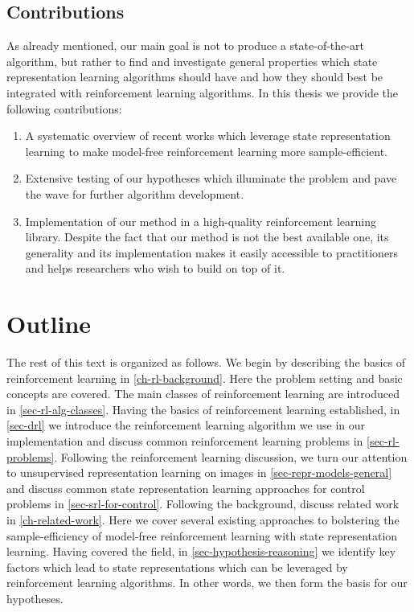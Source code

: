 \subsection{Contributions}
\label{subsec-contributions}
As already mentioned, our main goal is not to produce a state-of-the-art algorithm,
but rather to find and investigate general properties which state representation learning algorithms 
should have and how they should best be integrated with reinforcement learning algorithms.
In this thesis we provide the following contributions:
\begin{enumerate}
	\item A systematic overview of recent works which leverage state representation learning
		to make model-free reinforcement learning more sample-efficient.
	\item Extensive testing of our hypotheses which illuminate the problem and pave the wave 
			for further algorithm development.
	\item Implementation of our method in a high-quality reinforcement learning library.
			Despite the fact that our method is not the best available one, its generality
			and its implementation makes it easily accessible to practitioners and 
			helps researchers who wish to build on top of it.
\end{enumerate}

\section{Outline}
The rest of this text is organized as follows.
We begin by describing the basics of reinforcement learning in \ref{ch-rl-background}.
Here the problem setting and basic concepts are covered.
The main classes of 
reinforcement learning are introduced in \ref{sec-rl-alg-classes}.
Having the basics of reinforcement learning established, 
in \ref{sec-drl} we introduce the reinforcement learning algorithm 
we use in our implementation
and discuss common reinforcement learning problems in \ref{sec-rl-problems}.
Following the reinforcement learning discussion, we
turn our attention to unsupervised representation learning on images in \ref{sec-repr-models-general}
and discuss common state representation learning approaches for control problems in \ref{sec-srl-for-control}.
Following the background,
discuss related work in \ref{ch-related-work}.
Here we cover several existing approaches to bolstering the sample-efficiency of model-free reinforcement learning with
state representation learning. 
Having covered the field, in \ref{sec-hypothesis-reasoning} we identify key factors which lead to state representations which 
can be leveraged by reinforcement learning algorithms.
In other words, we then form the basis for our hypotheses.




